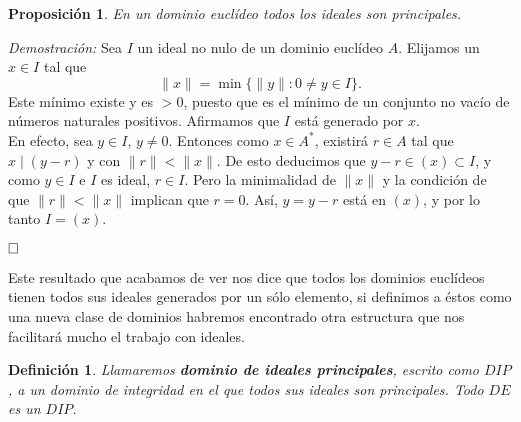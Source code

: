 \documentclass[12pt]{article}
\newtheorem{proposition}[theorem]{Proposición}
\newtheorem{definition}[theorem]{Definición}
\providecommand{\norm}[1]{\lVert#1\rVert}
\begin{document}
\begin{proposition}\label{eq:dedip} En un dominio euclídeo todos los ideales son principales.
\end{proposition}
\emph{Demostración: } Sea $I$ un ideal no nulo de un dominio euclídeo $A$. Elijamos un $x \in I$ tal que $$\norm{x} = \min \lbrace \norm{y} :0 \neq y \in I \rbrace.$$ Este mínimo existe y es $>0$, puesto que es el mínimo de un conjunto no vacío de números naturales positivos. Afirmamos que $I$ está generado por $x$.\vspace{0.2cm}\\
En efecto, sea $y \in I$, $y \neq 0$. Entonces como $x \in A^{\ast}$, existirá $r \in A$ tal que $x \mid (y-r)$ y con $\norm{r} < \norm{x}$. De esto deducimos que $y-r \in (x) \subset I$, y como $y \in I$ e $I$ es ideal, $r \in I$. Pero la minimalidad de $\norm{x}$ y la condición de que $\norm{r} < \norm{x}$ implican que $r = 0$. Así, $y = y-r$ está en $(x)$, y por lo tanto $I = (x)$.

$\hfill \square$

Este resultado que acabamos de ver nos dice que todos los dominios euclídeos tienen todos sus ideales generados por un sólo elemento, si definimos a éstos como una nueva clase de dominios habremos encontrado otra estructura que nos facilitará mucho el trabajo con ideales. 

\begin{definition} Llamaremos \textbf{dominio de ideales principales}, escrito como $DIP$, a un dominio de integridad en el que todos sus ideales son principales. Todo $DE$ es un $DIP$.
\end{definition} 
\end{document}
